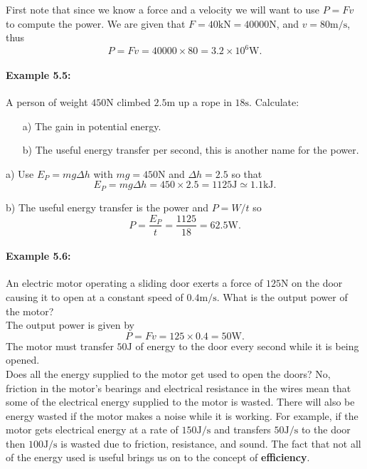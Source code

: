 \documentclass[a4paper,12pt]{book}
\begin{document}
First note that since we know a force and a velocity we will want to use $P=Fv$ to compute the power. We are given that $F=40\text{kN}=40000\text{N}$, and $v=80\text{m/s}$, thus
\begin{equation*}
P=Fv=40000\times 80 = 3.2\times 10^{6}\text{W}.
\end{equation*}


\paragraph{Example 5.5:} A person of weight $450\text{N}$ climbed $2.5\text{m}$ up a rope in $18\text{s}$. Calculate:
\begin{itemize}
\setlength{\itemsep}{-5pt}
    \item[a)] The gain in potential energy.
    \item[b)] The useful energy transfer per second, this is another name for the power.
\end{itemize} 

a) Use $E_{P}=mg\Delta h$ with $mg =450\text{N}$ and $\Delta h= 2.5$ so that
\begin{equation*}
E_{P}=mg\Delta h=450\times 2.5 =1125\text{J}\simeq 1.1\text{kJ}.
\end{equation*}

b) The useful energy transfer is the power and $P=W/t$ so 
\begin{equation*}
P=\frac{E_{P}}{t}=\frac{1125}{18}=62.5\text{W}.
\end{equation*}

\paragraph{Example 5.6:} An electric motor operating a sliding door exerts a force of $125\text{N}$ on the door causing it to open at a constant speed of $0.4 \text{m/s}$. What is the output power of the motor?\\

The output power is given by
\begin{equation*}
P=Fv=125\times 0.4 =50\text{W}.
\end{equation*}
The motor must transfer $50\text{J}$ of energy to the door every second while it is being opened.\\

Does all the energy supplied to the motor get used to open the doors? No, friction in the motor's bearings and electrical resistance in the wires mean that some of the electrical energy supplied to the motor is wasted. There will also be energy wasted if the motor makes a noise while it is working. For example, if the motor gets electrical energy at a rate of $150\text{J/s}$ and transfers $50\text{J/s}$ to the door then $100\text{J/s}$ is wasted due to friction, resistance, and sound. The fact that not all of the energy used is useful brings us on to the concept of \textbf{efficiency}.\\
\end{document}
